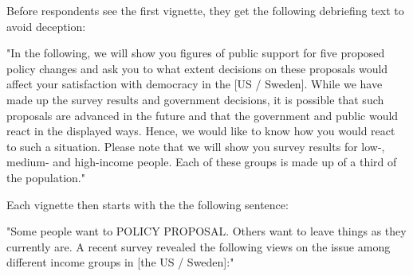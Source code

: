 \documentclass[12pt, letterpaper]{article}
\begin{document}
\begin{spacing}{1.5}
Before respondents see the first vignette, they get the following debriefing text to avoid deception:

"In the following, we will show you figures of public support for five proposed policy changes and ask you to what extent decisions on these proposals would affect your satisfaction with democracy in the [US / Sweden]. While we have made up the survey results and government decisions, it is possible that such proposals are advanced in the future and that the government and public would react in the displayed ways. Hence, we would like to know how you would react to such a situation. Please note that we will show you survey results for low-, medium- and high-income people. Each of these groups is made up of a third of the population."

Each vignette then starts with the the following sentence:

"Some people want to POLICY PROPOSAL. Others want to leave things as they currently are.
A recent survey revealed the following views on the issue among different income groups in [the US / Sweden]:"


\end{spacing}
\end{document}
